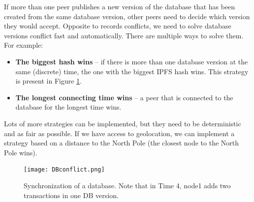 If more than one peer publishes a new version of the database that has been created from the same database version, other peers need to decide which version they would accept. Opposite to records conflicts, we need to solve database versions conflict fast and automatically. There are multiple ways to solve them. For example: 
\begin{itemize}
    \item \textbf{The biggest hash wins} -- if there is more than one database version at the same (discrete) time, the one with the biggest IPFS hash wins. This strategy is present in Figure \ref{databaseConflict}. 
    \item \textbf{The longest connecting time wins} -- a peer that is connected to the database for the longest time wins.
\end{itemize}
Lots of more strategies can be implemented, but they need to be deterministic and as fair as possible. If we have access to geolocation, we can implement a strategy based on a distance to the North Pole (the closest node to the North Pole wins).\cite{lamport2019time}

\begin{figure}[h]
    \centering
    \texttt{[image: DBconflict.png]}
    \caption{Synchronization of a database. Note that in Time 4, node1 adds two transactions in one DB version.}
    \label{databaseConflict}
\end{figure}

